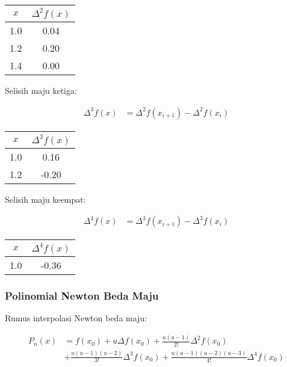 \documentclass{article}
\begin{document}
\begin{center}
\begin{tabular}{|c|c|}
    \hline
    $x$ & $\Delta^2 f(x)$ \\
    \hline
    1.0 & 0.04 \\
    1.2 & 0.20 \\
    1.4 & 0.00 \\
    \hline
\end{tabular}
\end{center}

Selisih maju ketiga:

\begin{align*}
    \Delta^3 f(x) &= \Delta^2 f(x_{i+1}) - \Delta^2 f(x_i)
\end{align*}

\begin{center}
\begin{tabular}{|c|c|}
    \hline
    $x$ & $\Delta^3 f(x)$ \\
    \hline
    1.0 & 0.16 \\
    1.2 & -0.20 \\
    \hline
\end{tabular}
\end{center}

Selisih maju keempat:

\begin{align*}
    \Delta^4 f(x) &= \Delta^3 f(x_{i+1}) - \Delta^3 f(x_i)
\end{align*}

\begin{center}
\begin{tabular}{|c|c|}
    \hline
    $x$ & $\Delta^4 f(x)$ \\
    \hline
    1.0 & -0.36 \\
    \hline
\end{tabular}
\end{center}

\subsubsection{Polinomial Newton Beda Maju}
Rumus interpolasi Newton beda maju:

\begin{align*}
    P_n(x) &= f(x_0) + u\Delta f(x_0) + \frac{u(u-1)}{2!} \Delta^2 f(x_0) \\
    &+ \frac{u(u-1)(u-2)}{3!} \Delta^3 f(x_0) + \frac{u(u-1)(u-2)(u-3)}{4!} \Delta^4 f(x_0)
\end{align*}
\end{document}
